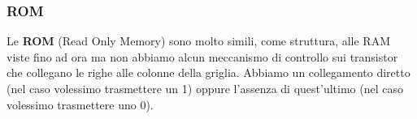 \subsubsection{ROM}
Le \textbf{ROM} (Read Only Memory) sono molto simili, come struttura, alle RAM viste fino ad ora
ma non abbiamo alcun meccanismo di controllo sui transistor che collegano le righe alle colonne
della griglia. Abbiamo un collegamento diretto (nel caso volessimo trasmettere un 1) oppure
l'assenza di quest'ultimo (nel caso volessimo trasmettere uno 0).